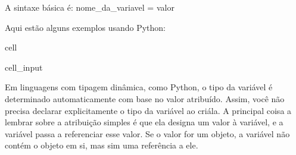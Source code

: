\documentclass[letterpaper,10pt,english]{jupyterBook}
\begin{document}
\sphinxAtStartPar
A sintaxe básica é:
nome\_da\_variavel = valor

\sphinxAtStartPar
Aqui estão alguns exemplos usando Python:

\begin{sphinxuseclass}{cell}\begin{sphinxVerbatimInput}

\begin{sphinxuseclass}{cell_input}
\begin{sphinxVerbatim}[commandchars=\\\{\}]
               
        
       
         
\end{sphinxVerbatim}

\end{sphinxuseclass}\end{sphinxVerbatimInput}

\end{sphinxuseclass}
\sphinxAtStartPar
Em linguagens com tipagem dinâmica, como Python, o tipo da variável é determinado automaticamente com base no valor atribuído. Assim, você não precisa declarar explicitamente o tipo da variável ao criá\sphinxhyphen{}la.
A principal coisa a lembrar sobre a atribuição simples é que ela designa um valor à variável, e a variável passa a referenciar esse valor. Se o valor for um objeto, a variável não contém o objeto em si, mas sim uma referência a ele.
\end{document}
